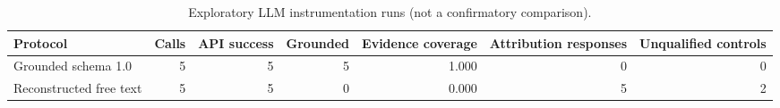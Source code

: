 \begin{table}[htbp]
\centering
\caption{Exploratory LLM instrumentation runs (not a confirmatory comparison).}
\label{tab:llm-exploratory}
\small
\begin{adjustbox}{max width=\linewidth}
\begin{tabular}{lrrrrrr}
\toprule
Protocol & Calls & API success & Grounded & Evidence coverage & Attribution responses & Unqualified controls \\
\midrule
Grounded schema 1.0 & 5 & 5 & 5 & 1.000 & 0 & 0 \\
Reconstructed free text & 5 & 5 & 0 & 0.000 & 5 & 2 \\
\bottomrule
\end{tabular}
\end{adjustbox}
\par{}
\par{}
\end{table}
